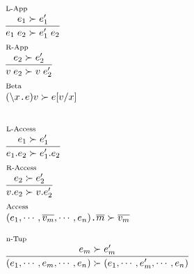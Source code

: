 \documentclass{standalone}
\begin{document}
$
\begin{array}{l}
  \begin{array}{l}{\scriptsize\text{L-App}}\\\infer{e_1\; e_2 \succ e_1'\; e_2}{e_1 \succ e_1'} \end{array}\\[1.5em]

  \begin{array}{l}{\scriptsize\text{R-App}}\\\infer{v\;e_2 \succ v\;e_2'}{e_2 \succ e_2'} \end{array} \\[1.5em]

  \begin{array}{l}{\scriptsize\text{Beta}}\\(\backslash x\texttt{.} e) v \succ e[v/x]\end{array} \\[1.5em]
\end{array}
$

$
\begin{array}{l}
  \begin{array}{l}{\scriptsize\text{L-Access}}\\\infer{e_1.e_2 \succ e_1'.e_2}{e_1 \succ e_1'} \end{array}\\[1.5em]

  \begin{array}{l}{\scriptsize\text{R-Access}}\\\infer{v.e_2 \succ v.e_2'}{e_2 \succ e_2'} \end{array}\\[1.5em]

  \begin{array}{l}{\scriptsize\text{Access}}\\(e_1,\cdots,\overline{v_m},\cdots,e_n)\texttt{.} \overline{m} \succ \overline{v_m} \end{array} \\[1.5em]

  \begin{array}{l}{\scriptsize \text{n-Tup}} \\ \infer{(e_1,\cdots,e_m,\cdots,e_n) \succ (e_1,\cdots,e_m',\cdots,e_n)}{e_m \succ e_m'} \end{array} \\[1.5em]
\end{array}
$
\end{document}
